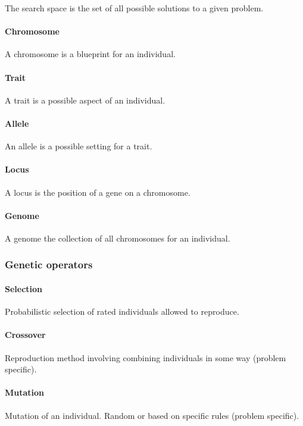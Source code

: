 The search space is the set of all possible solutions to a given problem.

\paragraph{Chromosome}

A chromosome is a blueprint for an individual.

\paragraph{Trait}

A trait is a possible aspect of an individual.

\paragraph{Allele}

An allele is a possible setting for a trait.

\paragraph{Locus}

A locus is the position of a gene on a chromosome.

\paragraph{Genome}

A genome the collection of all chromosomes for an individual.

\subsubsection{Genetic operators}

\paragraph{Selection}
Probabilistic selection of rated individuals allowed to reproduce.

\paragraph{Crossover}
Reproduction method involving combining individuals in some way (problem specific). 

\paragraph{Mutation}
Mutation of an individual. Random or based on specific rules (problem specific). 

